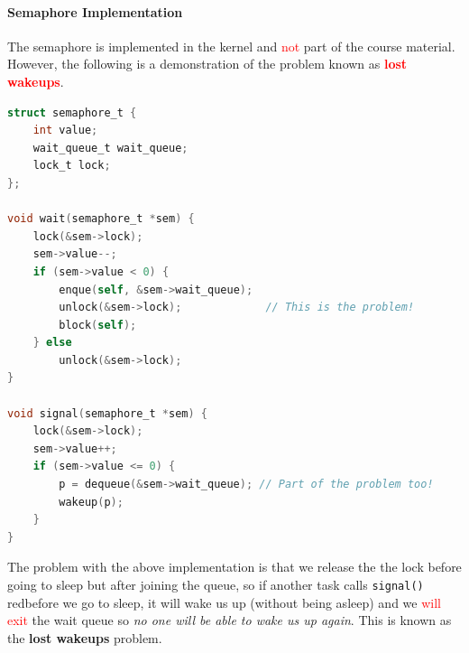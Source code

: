 \documentclass[openany,12pt]{book}
\newcommand{\code}[1]{\texttt{#1}}
\newcommand{\red}[1]{\textcolor{Red}{#1}}
\begin{document}
\paragraph{Semaphore Implementation} The semaphore is implemented in the kernel and \red{not} part of the course material. However, the following is a demonstration of the problem known as \red{\textbf{lost wakeups}}.
\begin{lstlisting}[language=C, caption={Lost Wakeups Problem}, label={lst:lost_wakeups}]
struct semaphore_t {
    int value;                          
    wait_queue_t wait_queue;            
    lock_t lock;                        
};

void wait(semaphore_t *sem) {
    lock(&sem->lock);
    sem->value--; 
    if (sem->value < 0) {
        enque(self, &sem->wait_queue);
        unlock(&sem->lock);             // This is the problem!
        block(self);
    } else 
        unlock(&sem->lock);
}

void signal(semaphore_t *sem) {
    lock(&sem->lock);
    sem->value++;
    if (sem->value <= 0) {
        p = dequeue(&sem->wait_queue); // Part of the problem too!
        wakeup(p);
    }
}
\end{lstlisting}
The problem with the above implementation is that we release the the lock before going to sleep but after joining the queue, so if another task calls \code{signal()} red{before} we go to sleep, it will wake us up (without being asleep) and we \red{will exit} the wait queue so \textit{no one will be able to wake us up again}. This is known as the \textbf{lost wakeups} problem.
\end{document}

